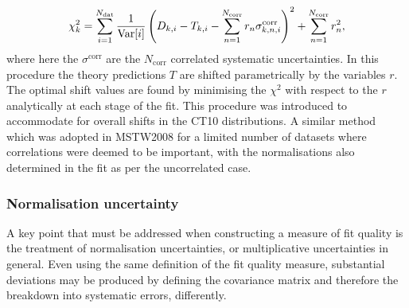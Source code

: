 \begin{equation} \label{eq:CTchi2}
\chi^{2}_k =  \sum_{i=1}^{N_{\mathrm{dat}}} \frac{1}{%
\mathrm{Var}[i]} \left(D_{k,i}-T_{k,i}-\sum_{n=1}^{N_{\mathrm{corr}}}r_{n}\sigma^{\mathrm{corr}}_{k,n,i}\right)^{2}
+\sum_{n=1}^{N_{\mathrm{corr}}} r_{n}^{2},
\end{equation}
where here the $\sigma^{\mathrm{corr}}$ are the $N_{\mathrm{corr}}$ correlated systematic uncertainties. In this procedure the theory predictions $T$ are shifted parametrically by the variables $r$. The optimal shift values are found by minimising the $\chi^2$ with respect to the $r$ analytically at each stage of the fit. This procedure was introduced to accommodate for overall shifts in the CT10 distributions. A similar method which was adopted in MSTW2008 for a limited number of datasets where correlations were deemed to be important, with the normalisations also determined in the fit as per the uncorrelated case.

\subsubsection{Normalisation uncertainty}

A key point that must be addressed when constructing a measure of fit quality is the treatment of normalisation uncertainties, or multiplicative uncertainties in general. Even using the same definition of the fit quality measure, substantial deviations may be produced by defining the covariance matrix and therefore the breakdown into systematic errors, differently.

